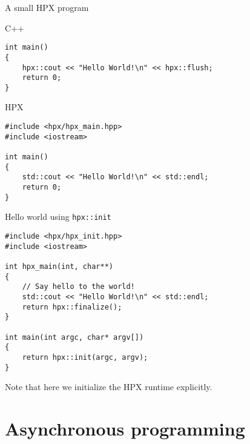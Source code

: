 \documentclass[12pt,t]{beamer}
\begin{document}
\begin{frame}[fragile]{A small HPX program}

\begin{block}{C++}
\begin{lstlisting}
int main()
{
    hpx::cout << "Hello World!\n" << hpx::flush;
    return 0;
}
\end{lstlisting}
\end{block}

\begin{block}{HPX}
\begin{lstlisting}
#include <hpx/hpx_main.hpp>
#include <iostream>

int main()
{
    std::cout << "Hello World!\n" << std::endl;
    return 0;
}
\end{lstlisting}
\end{block}

\end{frame}


\begin{frame}[fragile]{Hello world using \lstinline{hpx::init}}

\begin{lstlisting}
#include <hpx/hpx_init.hpp>
#include <iostream>

int hpx_main(int, char**)
{
    // Say hello to the world!
    std::cout << "Hello World!\n" << std::endl;
    return hpx::finalize();
}

int main(int argc, char* argv[])
{
    return hpx::init(argc, argv);
}
\end{lstlisting}
\begin{center}
Note that here we  initialize the HPX runtime explicitly.
\end{center}
\end{frame}

\section{Asynchronous programming}
\end{document}
